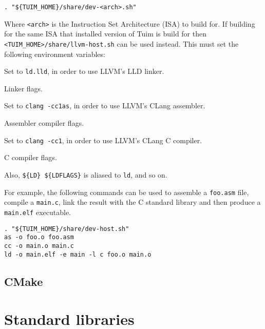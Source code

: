 \documentclass[
   12pt,                         %
   openright,                    %
   twoside,                      %
   a4paper,                      %
   sumario = tradicional,        %
   english,                      %
   xcolor=table                  %
]{abntex2}
\begin{document}
\begin{lstlisting}[style=bash]
. "${TUIM_HOME}/share/dev-<arch>.sh"
\end{lstlisting}

\noindent
Where \texttt{<arch>} is the Instruction Set Architecture (ISA) to build for.
If building for the same ISA that installed version of Tuim is build for then
\texttt{<TUIM\_HOME>/share/llvm-host.sh} can be used instead.
This must set the following environment variables:

\begin{description}[style=multiline,leftmargin2cm]
   \item[\texttt{LD}]
   Set to \texttt{ld.lld}, in order to use LLVM's LLD linker.
   \item[\texttt{LDFLAGS}]
   Linker flags.
   \item[\texttt{ASM}]
   Set to \texttt{clang -cc1as}, in order to use LLVM's CLang assembler.
   \item[\texttt{ASMFLAGS}]
   Assembler compiler flags.
   \item[\texttt{CC}]
   Set to \texttt{clang -cc1}, in order to use LLVM's CLang C compiler.
   \item[\texttt{CFLAGS}]
   C compiler flags.
\end{description}

\noindent
Also, \texttt{\$\{LD\} \$\{LDFLAGS\}} is aliased to \texttt{ld}, and so on.

For example, the following commands can be used to assemble a
\texttt{foo.asm} file, compile a \texttt{main.c}, link the result
with the C standard library and then produce a \texttt{main.elf} executable.

\begin{lstlisting}[style=bash]
. "${TUIM_HOME}/share/dev-host.sh"
as -o foo.o foo.asm
cc -o main.o main.c
ld -o main.elf -e main -l c foo.o main.o
\end{lstlisting}

\section{CMake}

\newpage
\chapter{Standard libraries}
\end{document}
